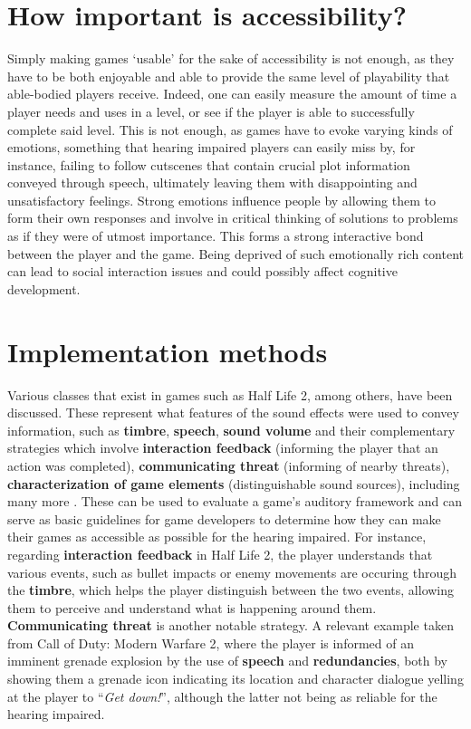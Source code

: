 \documentclass{scrartcl}
\begin{document}
\section{How important is accessibility?}
Simply making games `usable' for the sake of accessibility is not enough, as they have to be both enjoyable and able to provide the same level of playability that able-bodied players receive. Indeed, one can easily measure the amount of time a player needs and uses in a level, or see if the player is able to successfully complete said level. This is not enough, as games have to evoke varying kinds of emotions, something that hearing impaired players can easily miss by, for instance, failing to follow cutscenes that contain crucial plot information conveyed through speech, ultimately leaving them with disappointing and unsatisfactory feelings. Strong emotions influence people by allowing them to form their own responses and involve in critical thinking of solutions to problems as if they were of utmost importance. This forms a strong interactive bond between the player and the game. Being deprived of such emotionally rich content can lead to social interaction issues and could possibly affect cognitive development. 

\section{Implementation methods}
Various classes that exist in games such as Half Life 2, among others, have been discussed. These represent what features of the sound effects were used to convey information, such as \textbf{timbre}, \textbf{speech}, \textbf{sound volume} and their complementary strategies which involve \textbf{interaction feedback} (informing the player that an action was completed), \textbf{communicating threat} (informing of nearby threats), \textbf{characterization of game elements} (distinguishable sound sources), including many more \cite{Flav} \cite{Denise}. These can be used to evaluate a game's auditory framework and can serve as basic guidelines for game developers to determine how they can make their games as accessible as possible for the hearing impaired. For instance, regarding \textbf{interaction feedback} in Half Life 2, the player understands that various events, such as bullet impacts or enemy movements are occuring through the \textbf{timbre}, which helps the player distinguish between the two events, allowing them to perceive and understand what is happening around them. \textbf{Communicating threat} is another notable strategy. A relevant example taken from Call of Duty: Modern Warfare 2, where the player is informed of an imminent grenade explosion by the use of \textbf{speech} and \textbf{redundancies}, both by showing them a grenade icon indicating its location and character dialogue yelling at the player to  ``\textit{Get down!}'', although the latter not being as reliable for the hearing impaired. \cite{Denise}
\end{document}
